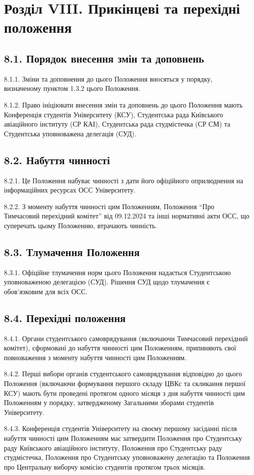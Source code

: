\section*{Розділ VIII. Прикінцеві та перехідні положення}

\subsection*{8.1. Порядок внесення змін та доповнень}
    8.1.1. Зміни та доповнення до цього Положення вносяться у порядку, визначеному пунктом 1.3.2 цього Положення.

    8.1.2. Право ініціювати внесення змін та доповнень до цього Положення мають Конференція студентів Університету (КСУ), Студентська рада Київського авіаційного інституту (СР КАІ), Студентська рада студмістечка (СР СМ) та Студентська уповноважена делегація (СУД).

\subsection*{8.2. Набуття чинності}
    8.2.1. Це Положення набуває чинності з дати його офіційного оприлюднення на інформаційних ресурсах ОСС Університету.

    8.2.2. З моменту набуття чинності цим Положенням, Положення ``Про Тимчасовий перехідний комітет'' від 09.12.2024 та інші нормативні акти ОСС, що суперечать цьому Положенню, втрачають чинність.

\subsection*{8.3. Тлумачення Положення}
    8.3.1. Офіційне тлумачення норм цього Положення надається Студентською уповноваженою делегацією (СУД). Рішення СУД щодо тлумачення є обов'язковим для всіх ОСС.

\subsection*{8.4. Перехідні положення}
    8.4.1. Органи студентського самоврядування (включаючи Тимчасовий перехідний комітет), сформовані до набуття чинності цим Положенням, припиняють свої повноваження з моменту набуття чинності цим Положенням.

    8.4.2. Перші вибори органів студентського самоврядування відповідно до цього Положення (включаючи формування першого складу ЦВКс та скликання першої КСУ) мають бути проведені протягом одного місяця з дня набуття чинності цим Положенням у порядку, затвердженому Загальними зборами студентів Університету.

    8.4.3. Конференція студентів Університету на своєму першому засіданні після набуття чинності цим Положенням має затвердити Положення про Студентську раду Київського авіаційного інституту, Положення про Студентську раду студмістечка, Положення про Студентську уповноважену делегацію та Положення про Центральну виборчу комісію студентів протягом трьох місяців.
